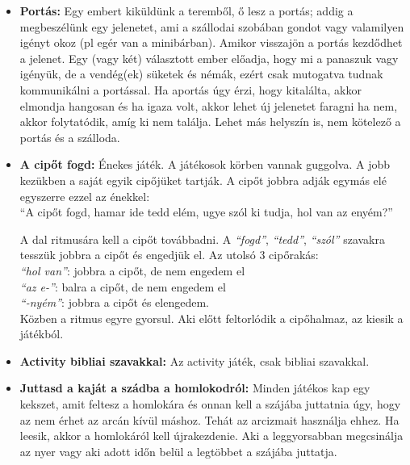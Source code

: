 \documentclass[a4paper, 12pt, twoside, openright]{article}
\begin{document}
\begin{itemize}
\item \textbf{Portás:} Egy embert kiküldünk a teremből, ő lesz a portás; addig a megbeszélünk egy jelenetet, ami a szállodai szobában gondot vagy valamilyen igényt okoz (pl egér van a minibárban). Amikor visszajön a portás kezdődhet a jelenet. Egy (vagy két) választott ember előadja, hogy mi a panaszuk vagy igényük, de a vendég(ek) süketek és némák, ezért csak mutogatva tudnak kommunikálni a portással. Ha aportás úgy érzi, hogy kitalálta, akkor elmondja hangosan és ha igaza volt, akkor lehet új jelenetet faragni ha nem, akkor folytatódik, amíg ki nem találja. Lehet más helyszín is, nem kötelező a portás és a szálloda.

\item \textbf{A cipőt fogd:} Énekes játék. A játékosok körben vannak guggolva. A jobb kezükben a saját egyik cipőjüket tartják. A cipőt jobbra adják egymás elé egyszerre ezzel az énekkel:\\
``A cipőt fogd, hamar ide tedd elém, ugye
szól ki tudja, hol van az enyém?''

A dal ritmusára kell a cipőt továbbadni. A \emph{``fogd''}, \emph{``tedd''}, \emph{``szól''} szavakra tesszük jobbra a cipőt és engedjük el. Az utolsó 3 cipőrakás:\\
\emph{``hol van''}: jobbra a cipőt, de nem engedem el\\
\emph{``az e-''}: balra a cipőt, de nem engedem el\\
\emph{``-nyém''}: jobbra a cipőt és elengedem.\\

Közben a ritmus egyre gyorsul. Aki előtt feltorlódik a cipőhalmaz, az kiesik a játékból.

\item \textbf{Activity bibliai szavakkal:} Az activity játék, csak bibliai szavakkal. 

\item \textbf{Juttasd a kaját a szádba a homlokodról:} Minden játékos kap egy kekszet, amit feltesz a homlokára és onnan kell a szájába juttatnia úgy, hogy az nem érhet az arcán kívül máshoz. Tehát az arcizmait használja ehhez. Ha leesik, akkor a homlokáról kell újrakezdenie. Aki a leggyorsabban megcsinálja az nyer vagy aki adott időn belül a legtöbbet a szájába juttatja.


\end{itemize}
\end{document}
